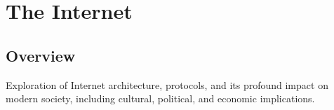 \chapter{The Internet}

\section*{Overview}
Exploration of Internet architecture, protocols, and its profound impact on modern society, including cultural, political, and economic implications.


